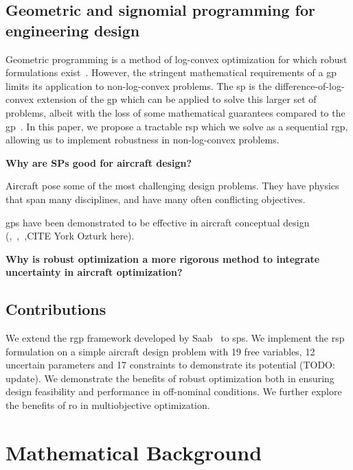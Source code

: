 \subsection{Geometric and signomial programming for engineering design}

Geometric programming is a method of log-convex optimization for which robust formulations exist~\cite{Saab2018}.
However, the stringent mathematical requirements of a \gls{gp} limits its application to non-log-convex problems.
The \gls{sp} is the difference-of-log-convex extension of the \gls{gp} which can be applied to
solve this larger set of problems, albeit with the loss of some mathematical guarantees compared to the \gls{gp}~\cite{Kirschen2016}.
In this paper, we propose a tractable \gls{rsp} which we solve as a sequential \gls{rgp},
allowing us to implement robustness in non-log-convex problems.

\textbf{Why are SPs good for aircraft design?}

Aircraft pose some of the most challenging design problems. They have physics that span many disciplines,
and have many often conflicting objectives.

\gls{gp}s have been demonstrated to be effective in aircraft conceptual design
(\cite{Hoburg2013},~\cite{Burton2017},~\cite{Kirschen2017},CITE York Ozturk here).

\textbf{Why is robust optimization a more rigorous method to integrate uncertainty in aircraft optimization?}



\subsection{Contributions}

We extend the \gls{rgp} framework developed by Saab~\cite{Saab2018} to \gls{sp}s.
We implement the \gls{rsp} formulation on a simple aircraft design problem with 19 free variables,
12 uncertain parameters and 17 constraints to demonstrate its potential (TODO: update).
We demonstrate the benefits of robust optimization both in ensuring design feasibility and performance
in off-nominal conditions. We further explore the benefits of \gls{ro} in multiobjective optimization.

\section{Mathematical Background}
